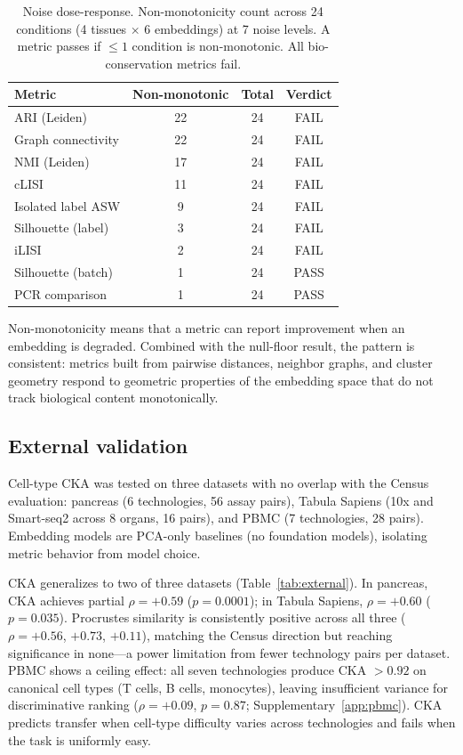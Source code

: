 \documentclass[11pt]{article}
\begin{document}
\begin{table}[t]
\centering
\caption{Noise dose-response. Non-monotonicity count across 24
conditions (4 tissues $\times$ 6 embeddings) at 7 noise levels. A
metric passes if $\leq 1$ condition is non-monotonic. All
bio-conservation metrics fail.}
\label{tab:noise}
\small
\begin{tabular}{@{}lccc@{}}
\toprule
Metric & Non-monotonic & Total & Verdict \\
\midrule
ARI (Leiden)         & 22 & 24 & FAIL \\
Graph connectivity   & 22 & 24 & FAIL \\
NMI (Leiden)         & 17 & 24 & FAIL \\
cLISI                & 11 & 24 & FAIL \\
Isolated label ASW   &  9 & 24 & FAIL \\
Silhouette (label)   &  3 & 24 & FAIL \\
iLISI                &  2 & 24 & FAIL \\
\midrule
Silhouette (batch)   &  1 & 24 & PASS \\
PCR comparison       &  1 & 24 & PASS \\
\bottomrule
\end{tabular}
\end{table}

Non-monotonicity means that a metric can report improvement when an
embedding is degraded. Combined with the null-floor result, the pattern
is consistent: metrics built from pairwise distances, neighbor graphs,
and cluster geometry respond to geometric properties of the embedding
space that do not track biological content monotonically.


\subsection{External validation}
\label{sec:external}

Cell-type CKA was tested on three datasets with no overlap with the
Census evaluation: pancreas \citep{luecken2022scib} (6 technologies, 56
assay pairs), Tabula Sapiens \citep{tabulasapiens2022} (10x and
Smart-seq2 across 8 organs, 16 pairs), and PBMC \citep{ding2020systematic}
(7 technologies, 28 pairs). Embedding models are PCA-only baselines (no
foundation models), isolating metric behavior from model choice.

CKA generalizes to two of three datasets
(Table~\ref{tab:external}). In pancreas, CKA achieves partial
$\rho = +0.59$ ($p = 0.0001$); in Tabula Sapiens, $\rho = +0.60$
($p = 0.035$). Procrustes similarity is consistently positive across all
three ($\rho = +0.56$, $+0.73$, $+0.11$), matching the Census direction
but reaching significance in none---a power limitation from fewer
technology pairs per dataset. PBMC shows a ceiling effect: all seven
technologies produce CKA $> 0.92$ on canonical cell types (T cells, B
cells, monocytes), leaving insufficient variance for discriminative
ranking ($\rho = +0.09$, $p = 0.87$; Supplementary~\ref{app:pbmc}). CKA
predicts transfer when cell-type difficulty varies across technologies
and fails when the task is uniformly easy.
\end{document}
